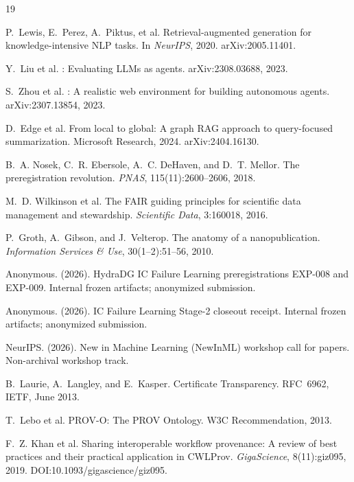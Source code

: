 \documentclass{article}
\begin{document}
\begin{thebibliography}{19}

P.~Lewis, E.~Perez, A.~Piktus, et al.
\newblock Retrieval-augmented generation for knowledge-intensive {NLP} tasks.
\newblock In \emph{NeurIPS}, 2020.
\newblock arXiv:2005.11401.

Y.~Liu et al.
: Evaluating {LLMs} as agents.
\newblock arXiv:2308.03688, 2023.

S.~Zhou et al.
: A realistic web environment for building autonomous agents.
\newblock arXiv:2307.13854, 2023.

D.~Edge et al.
\newblock From local to global: A graph {RAG} approach to query-focused summarization.
\newblock Microsoft Research, 2024.
\newblock arXiv:2404.16130.

B.~A. Nosek, C.~R. Ebersole, A.~C. DeHaven, and D.~T. Mellor.
\newblock The preregistration revolution.
\newblock \emph{PNAS}, 115(11):2600--2606, 2018.

M.~D. Wilkinson et al.
\newblock The {FAIR} guiding principles for scientific data management and stewardship.
\newblock \emph{Scientific Data}, 3:160018, 2016.

P.~Groth, A.~Gibson, and J.~Velterop.
\newblock The anatomy of a nanopublication.
\newblock \emph{Information Services \& Use}, 30(1--2):51--56, 2010.

Anonymous. (2026). HydraDG IC Failure Learning preregistrations EXP-008 and EXP-009. Internal frozen artifacts; anonymized submission.

Anonymous. (2026). IC Failure Learning Stage-2 closeout receipt. Internal frozen artifacts; anonymized submission.

NeurIPS. (2026). New in Machine Learning (NewInML) workshop call for papers. Non-archival workshop track.

B.~Laurie, A.~Langley, and E.~Kasper.
\newblock Certificate Transparency.
\newblock RFC~6962, IETF, June 2013.

T.~Lebo et al.
\newblock PROV-O: The PROV Ontology.
\newblock W3C Recommendation, 2013.

F.~Z. Khan et al.
\newblock Sharing interoperable workflow provenance: A review of best practices and their practical application in {CWLProv}.
\newblock \emph{GigaScience}, 8(11):giz095, 2019.
\newblock DOI:10.1093/gigascience/giz095.


\end{thebibliography}
\end{document}
